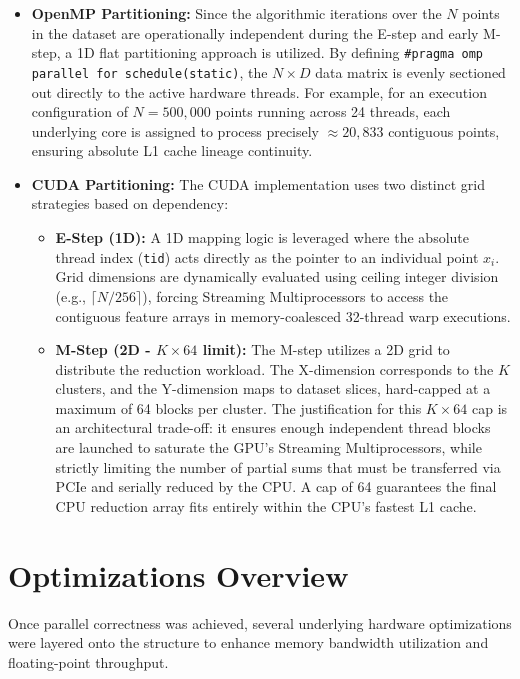 \documentclass[10pt]{article}
\begin{document}
\begin{itemize}
    \item \textbf{OpenMP Partitioning:} Since the algorithmic iterations over the $N$ points in the dataset are operationally independent during the E-step and early M-step, a 1D flat partitioning approach is utilized. By defining \texttt{\#pragma omp parallel for schedule(static)}, the $N \times D$ data matrix is evenly sectioned out directly to the active hardware threads. For example, for an execution configuration of $N=500,000$ points running across 24 threads, each underlying core is assigned to process precisely $\approx 20,833$ contiguous points, ensuring absolute L1 cache lineage continuity.
    \item \textbf{CUDA Partitioning:} The CUDA implementation uses two distinct grid strategies based on dependency:
    \begin{itemize}
        \item \textbf{E-Step (1D):} A 1D mapping logic is leveraged where the absolute thread index (\texttt{tid}) acts directly as the pointer to an individual point $x_i$. Grid dimensions are dynamically evaluated using ceiling integer division (e.g., $\lceil N / 256 \rceil$), forcing Streaming Multiprocessors to access the contiguous feature arrays in memory-coalesced 32-thread warp executions.
        \item \textbf{M-Step (2D - $K \times 64$ limit):} The M-step utilizes a 2D grid to distribute the reduction workload. The X-dimension corresponds to the $K$ clusters, and the Y-dimension maps to dataset slices, hard-capped at a maximum of 64 blocks per cluster. The justification for this $K \times 64$ cap is an architectural trade-off: it ensures enough independent thread blocks are launched to saturate the GPU's Streaming Multiprocessors, while strictly limiting the number of partial sums that must be transferred via PCIe and serially reduced by the CPU. A cap of 64 guarantees the final CPU reduction array fits entirely within the CPU's fastest L1 cache.
    \end{itemize}
\end{itemize}

\section{Optimizations Overview}
Once parallel correctness was achieved, several underlying hardware optimizations were layered onto the structure to enhance memory bandwidth utilization and floating-point throughput.
\end{document}
